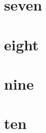 \documentclass{beamer}
\begin{document}
\section{seven}
\begin{frame}
\end{frame}

\section{eight}
\begin{frame}
\end{frame}

\section{nine}
\begin{frame}
\end{frame}

\section{ten}
\begin{frame}
\end{frame}
\end{document}
